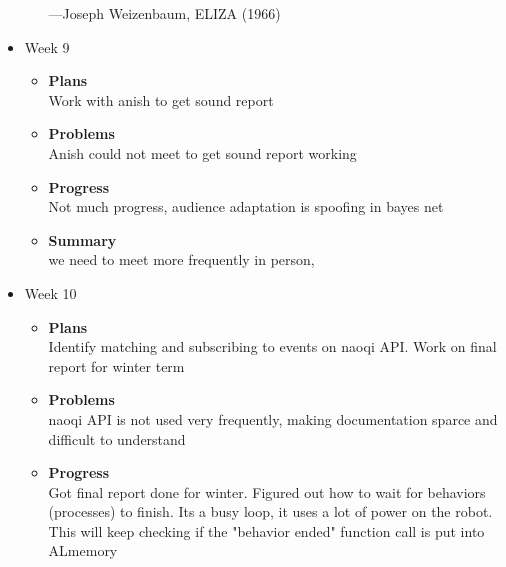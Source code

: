 \begin{itemize}
\begin{itemize}
				—Joseph Weizenbaum, ELIZA (1966) 

			\end{itemize}
		\item{Week 9}
			\begin{itemize}
				\item \textbf{Plans} \\
				Work with anish to get sound report
				\item \textbf{Problems} \\
				Anish could not meet to get sound report working
				\item \textbf{Progress} \\
				Not much progress, audience adaptation is spoofing in bayes net
				\item \textbf{Summary} \\
				we need to meet more frequently in person, 
			\end{itemize}
		\item{Week 10}
			\begin{itemize}
				\item \textbf{Plans} \\
				Identify matching and subscribing to events on naoqi API. Work on final report for winter term
				\item \textbf{Problems} \\
				naoqi API is not used very frequently, making documentation sparce and difficult to understand
				\item \textbf{Progress} \\
				Got final report done for winter.
				Figured out how to wait for behaviors (processes) to finish. Its a busy loop, it uses a lot of power on the robot.
				This will keep checking if the "behavior ended" function call is put into ALmemory 
			\end{itemize}
	\end{itemize}

